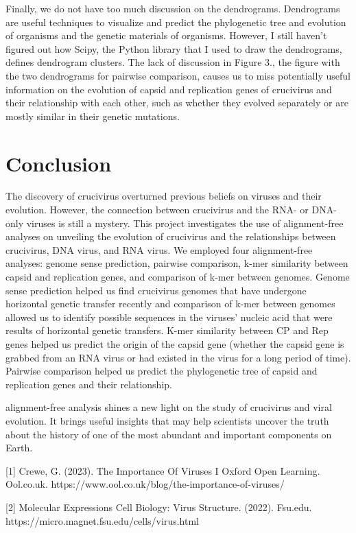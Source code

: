 \documentclass[eng]{ajceam-class}
\begin{document}
Finally, we do not have too much discussion on the dendrograms. Dendrograms are useful techniques to visualize and predict the phylogenetic tree and evolution of organisms and the genetic materials of organisms. However, I still haven't figured out how Scipy, the Python library that I used to draw the dendrograms, defines dendrogram clusters. The lack of discussion in Figure 3., the figure with the two dendrograms for pairwise comparison, causes us to miss potentially useful information on the evolution of capsid and replication genes of crucivirus and their relationship with each other, such as whether they evolved separately or are mostly similar in their genetic mutations. 

\section{Conclusion}
The discovery of crucivirus overturned previous beliefs on viruses and their evolution. However, the connection between crucivirus and the RNA- or DNA-only viruses is still a mystery. This project investigates the use of alignment-free analyses on unveiling the evolution of crucivirus and the relationships between crucivirus, DNA virus, and RNA virus. We employed four alignment-free analyses: genome sense prediction, pairwise comparison, k-mer similarity between capsid and replication genes, and comparison of k-mer between genomes. Genome sense prediction helped us find crucivirus genomes that have undergone horizontal genetic transfer recently and comparison of k-mer between genomes allowed us to identify possible sequences in the viruses' nucleic acid that were results of horizontal genetic transfers. K-mer similarity between CP and Rep genes helped us predict the origin of the capsid gene (whether the capsid gene is grabbed from an RNA virus or had existed in the virus for a long period of time). Pairwise comparison helped us predict the phylogenetic tree of capsid and replication genes and their relationship. 

alignment-free analysis shines a new light on the study of crucivirus and viral evolution. It brings useful insights that may help scientists uncover the truth about the history of one of the most abundant and important components on Earth.

[1] Crewe, G. (2023). The Importance Of Viruses I Oxford Open Learning. Ool.co.uk. https://www.ool.co.uk/blog/the-importance-of-viruses/

[2] Molecular Expressions Cell Biology: Virus Structure. (2022). Fsu.edu. https://micro.magnet.fsu.edu/cells/virus.html
\end{document}
